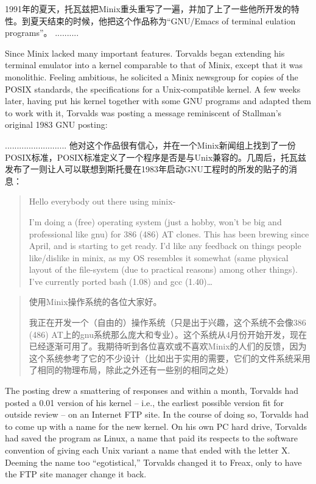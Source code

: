 \ifdefined\chs
1991年的夏天，托瓦兹把Minix重头重写了一遍，并加了上了一些他所开发的特性。到夏天结束的时候，他把这个作品称为“GNU/Emacs of terminal eulation programs”。 ..........
\fi

\ifdefined\eng
Since Minix lacked many important features. Torvalds began extending his terminal emulator into a kernel comparable to that of Minix, except that it was monolithic.  Feeling ambitious, he solicited a Minix newsgroup for copies of the POSIX standards, the specifications for a Unix-compatible kernel. A few weeks later, having put his kernel together with some GNU programs and adapted them to work with it, Torvalds was posting a message reminiscent of Stallman's original 1983 GNU posting:
\fi

\ifdefined\chs
..........................
他对这个作品很有信心，并在一个Minix新闻组上找到了一份POSIX标准，POSIX标准定义了一个程序是否是与Unix兼容的。几周后，托瓦兹发布了一则让人可以联想到斯托曼在1983年启动GNU工程时的所发的贴子的消息：
\fi

\ifdefined\eng
\begin{quote}
Hello everybody out there using minix-

I'm doing a (free) operating system (just a hobby, won't be big and professional like gnu) for 386 (486) AT clones. This has been brewing since April, and is starting to get ready. I'd like any feedback on things people like/dislike in minix, as my OS resembles it somewhat (same physical layout of the file-system (due to practical reasons) among other things).  I've currently ported bash (1.08) and gcc (1.40)\ldots{}
\end{quote}
\fi

\ifdefined\chs
\begin{quote}
使用Minix操作系统的各位大家好。

我正在开发一个（自由的）操作系统（只是出于兴趣，这个系统不会像386 (486) AT上的gnu系统那么庞大和专业）。这个系统从4月份开始开发，现在已经逐渐可用了。我期待听到各位喜欢或不喜欢Minix的人们的反馈，因为这个系统参考了它的不少设计（比如出于实用的需要，它们的文件系统采用了相同的物理布局，除此之外还有一些别的相同之处）
\end{quote}
\fi

\ifdefined\eng
The posting drew a smattering of responses and within a month, Torvalds had posted a 0.01 version of his kernel -- i.e., the earliest possible version fit for outside review -- on an Internet FTP site. In the course of doing so, Torvalds had to come up with a name for the new kernel. On his own PC hard drive, Torvalds had saved the program as Linux, a name that paid its respects to the software convention of giving each Unix variant a name that ended with the letter X. Deeming the name too ``egotistical,'' Torvalds changed it to Freax, only to have the FTP site manager change it back.
\fi

